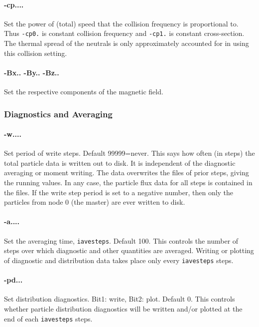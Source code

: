 \documentclass[12pt]{article}
\begin{document}
\paragraph{-cp....} Set the power of (total) speed that the
collision frequency is proportional to. Thus \verb!-cp0.! is constant
collision frequency and \verb!-cp1.! is constant cross-section. The
thermal spread of the neutrals is only approximately accounted for in
using this collision setting.


\paragraph{-Bx.. -By.. -Bz..} Set the respective components of the
magnetic field. 

\subsubsection*{Diagnostics and Averaging}

\paragraph{-w....}  Set period of write steps. Default 99999=never.
This says how often (in steps) the total particle data is written out to
disk. It is independent of the diagnostic averaging or moment writing.
The data overwrites the files of prior steps, giving the running
values. In any case, the particle flux data for all steps is contained in
the files. If the write step period is set to a negative number, then
only the particles from node 0 (the master) are ever
written to disk. 

\paragraph{-a....}  Set the averaging time, \verb!iavesteps!. Default 100.
This controls the number of steps over which diagnostic and other
quantities are averaged. Writing or plotting of diagnostic and
distribution data takes place only every \verb!iavesteps! steps.

\paragraph{-pd...}
Set distribution diagnostics. Bit1: write, Bit2: plot. Default 0.
This controls whether particle distribution diagnostics will be
written and/or plotted at the end of each \verb!iavesteps! steps. 
\end{document}
